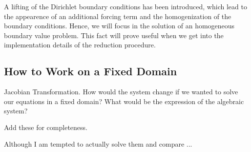 \documentclass[../../thesis.tex]{subfiles}
\begin{document}
A lifting of the Dirichlet boundary conditions has been introduced, which lead to the appearence of an additional forcing term and the homogenization of the boundary conditions.
Hence, we will focus in the solution of an homogeneous boundary value problem.
This fact will prove useful when we get into the implementation details of the reduction procedure.


\subsection{How to Work on a Fixed Domain}

Jacobian Transformation.
How would the system change if we wanted to solve our equations in a fixed domain?
What would be the expression of the algebraic system?

Add these for completeness.

Although I am tempted to actually solve them and compare ... 
\end{document}
